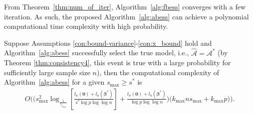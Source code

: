 From Theorem~\ref{thm:num_of_iter}, Algorithm~\ref{alg:fbess} converges with a few iteration.
As such, the proposed Algorithm~\ref{alg:abess} can achieve a polynomial computational time complexity with high probability.
\begin{theorem}\label{thm:complexity}
Suppose Assumptions \ref{con:bound-variance}-\ref{con:x_bound} hold and
Algorithm~\ref{alg:abess} successfully select the true model, i.e., $\hat{\mathcal{A}} = \mathcal{A}^*$
(by Theorem \ref{thm:consistency4}, this event is true with a large probability for sufficiently large sample size $n$),
then the computational complexity of Algorithm~\ref{alg:abess} for a given $s_{\max}\geq s^*$ is
\begin{align*}
O\Big(\big(s^2_{\max}\log_{\frac{1}{\gamma_{s_{\max}}}} \left[\frac{l_n(\boldsymbol 0) + l_n(\boldsymbol\beta^*)}{s^*\log p\log\log n}\right] + \frac{l_n(\boldsymbol 0) + l_n(\boldsymbol\beta^*)}{\log p\log\log n}\big)\big( k_{\max}ns_{\max} + k_{\max}p \big)\Big).
\end{align*}
\end{theorem}
